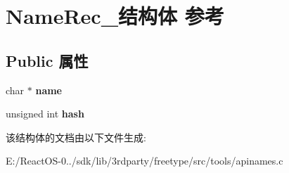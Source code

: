 \hypertarget{struct_name_rec__}{}\section{Name\+Rec\+\_\+结构体 参考}
\label{struct_name_rec__}
\subsection*{Public 属性}
\begin{DoxyCompactItemize}
\item 
\mbox{\label{struct_name_rec___a0948afa3916e5316e5a79d0a7958360a}} 
char $\ast$ {\bfseries name}
\item 
\mbox{\label{struct_name_rec___abaf93b3d85d7692e234ccad0c25e3f93}} 
unsigned int {\bfseries hash}
\end{DoxyCompactItemize}


该结构体的文档由以下文件生成\+:\begin{DoxyCompactItemize}
\item 
E\+:/\+React\+O\+S-\/0../sdk/lib/3rdparty/freetype/src/tools/apinames.\+c\end{DoxyCompactItemize}
